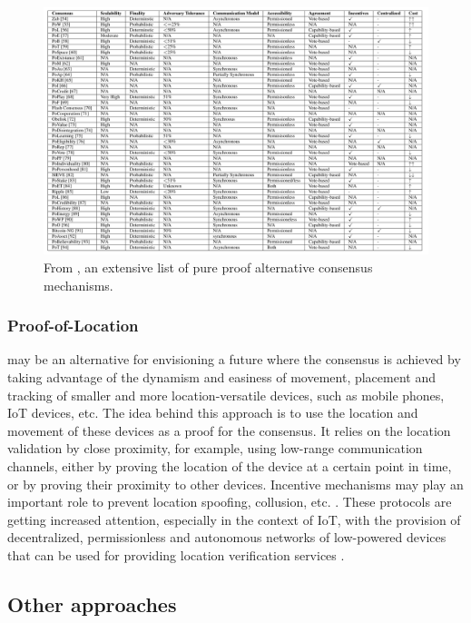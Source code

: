 \documentclass[journal]{IEEEtran}
\begin{document}
\begin{figure}[h]
  \centering
  \captionsetup{justification=centering}
  \includegraphics[width=\textwidth]{proof-alternative-consensus}
  \caption{From \cite{9376868}, an extensive list of pure proof alternative consensus mechanisms.}
  \label{fig:proof-alternative-consensus}
\end{figure}

\subsubsection{Proof-of-Location} may be an alternative for envisioning a future where the
consensus is achieved by taking advantage of the dynamism and easiness of movement, placement and 
tracking of smaller and more location-versatile devices, such as mobile phones, IoT devices, etc.
The idea behind this approach is to use the location and movement of these devices 
as a proof for the consensus. It relies on the location validation by close proximity, 
for example, using low-range communication channels, either by proving the location
of the device at a certain point in time, or by proving their proximity to other devices.
Incentive mechanisms may play an important role to prevent location spoofing, collusion, etc. \cite{natoli2019deconstructing}.
These protocols are getting increased attention, especially in the context of IoT, 
with the provision of decentralized, permissionless and autonomous networks of 
low-powered devices that can be used for providing location verification services \cite{9376868}.

\subsection{Other approaches}
\end{document}
